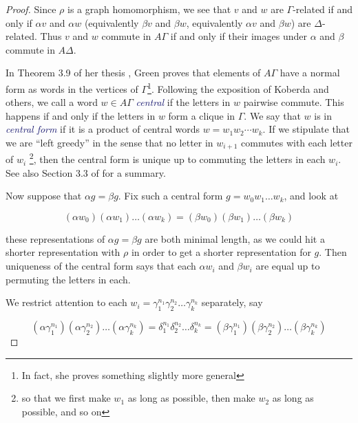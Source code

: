 \documentclass[12pt]{article}
\theoremstyle{definition}
\theoremstyle{theorem}
\newcommand*{\important}[1]{\textcolor{MidnightBlue}{\emph{#1}}}
\begin{document}
\begin{proof}
    Since $\rho$ is a graph
    homomorphism, we see that $v$ and $w$ are $\Gamma$-related if and only if $\alpha v$
    and $\alpha w$ (equivalently $\beta v$ and $\beta w$, equivalently $\alpha v$ and $\beta w$) 
    are $\Delta$-related. Thus $v$ and $w$ commute in $A \Gamma$ if and only 
    if their images under $\alpha$ and $\beta$ commute in $A \Delta$.

    In Theorem 3.9 of her thesis \cite{greenGraphProductsGroups1990}, 
    Green proves that elements of $A \Gamma$ have a normal form as words 
    in the vertices of $\Gamma$\footnote{In fact, she proves something slightly more general}.
    Following the exposition of Koberda \cite{koberdaRightangledArtinGroups2012} 
    and others, we call a word $w \in A \Gamma$ \important{central} if the 
    letters in $w$ pairwise commute. This happens if and only if the letters 
    in $w$ form a clique in $\Gamma$. We say that $w$ is in 
    \important{central form} if it is a product of central words 
    $w = w_1 w_2 \cdots w_k$. If we stipulate that we are ``left greedy'' 
    in the sense that no letter in $w_{i+1}$ commutes with each letter of $w_i$%
    \footnote{so that we first make $w_1$ as long as possible, then make $w_2$ as long as possible, and so on},
    then the central form is unique up to commuting the letters in each $w_i$.
    See also Section 3.3 of \cite{charneyIntroductionRightangledArtin2007} for a summary.

    Now suppose that $\alpha g = \beta g$. Fix such a central form
    $g = w_0 w_1 \ldots w_k$, and look at 

    \[ (\alpha w_0) (\alpha w_1) \ldots (\alpha w_k) = (\beta w_0) (\beta w_1) \ldots (\beta w_k) \]

    these representations of $\alpha g = \beta g$ are both minimal length, as 
    we could hit a shorter representation with $\rho$ in order to get a 
    shorter representation for $g$. Then uniqueness of the central form
    says that each $\alpha w_i$ and $\beta w_i$ are equal up to permuting the 
    letters in each. 
    
    We restrict attention to each 
    $w_i = \gamma_1^{n_1} \gamma_2^{n_2} \ldots \gamma_k^{n_k}$ separately, say

    \[ 
    (\alpha \gamma_1^{n_1}) (\alpha \gamma_2^{n_2}) \ldots (\alpha \gamma_k^{n_k}) = 
    \delta_1^{n_1} \delta_2^{n_2} \ldots \delta_k^{n_k} =
    (\beta \gamma_1^{n_1}) (\beta \gamma_2^{n_2}) \ldots (\beta \gamma_k^{n_k})
    \]


\end{proof}
\end{document}
